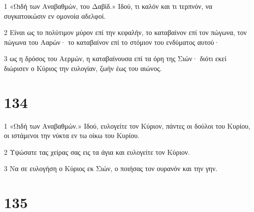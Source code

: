 \par 1 «Ωιδή των Αναβαθμών, του Δαβίδ.» Ιδού, τι καλόν και τι τερπνόν, να συγκατοικώσιν εν ομονοία αδελφοί.
\par 2 Είναι ως το πολύτιμον μύρον επί την κεφαλήν, το καταβαίνον επί τον πώγωνα, τον πώγωνα του Ααρών· το καταβαίνον επί το στόμιον του ενδύματος αυτού·
\par 3 ως η δρόσος του Αερμών, η καταβαίνουσα επί τα όρη της Σιών· διότι εκεί διώρισεν ο Κύριος την ευλογίαν, ζωήν έως του αιώνος.

\chapter{134}

\par 1 «Ωιδή των Αναβαθμών.» Ιδού, ευλογείτε τον Κύριον, πάντες οι δούλοι του Κυρίου, οι ιστάμενοι την νύκτα εν τω οίκω του Κυρίου.
\par 2 Υψώσατε τας χείρας σας εις τα άγια και ευλογείτε τον Κύριον.
\par 3 Να σε ευλογήση ο Κύριος εκ Σιών, ο ποιήσας τον ουρανόν και την γην.

\chapter{135}

